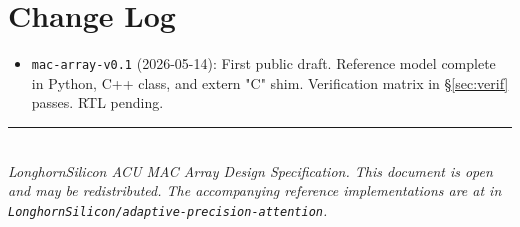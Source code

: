 \documentclass[11pt]{article}
\begin{document}
\section{Change Log}
\label{sec:changelog}

\begin{itemize}
\item \texttt{mac-array-v0.1} (2026-05-14): First public draft.
      Reference model complete in Python, C++ class, and extern "C"
      shim. Verification matrix in \S\ref{sec:verif} passes. RTL
      pending.
\end{itemize}

\vspace{0.5in}
\noindent\rule{\textwidth}{0.4pt}\\
\noindent\small\textit{LonghornSilicon ACU MAC Array Design Specification.
This document is open and may be redistributed. The accompanying
reference implementations are at
 in
\texttt{LonghornSilicon/adaptive-precision-attention}.}
\end{document}
